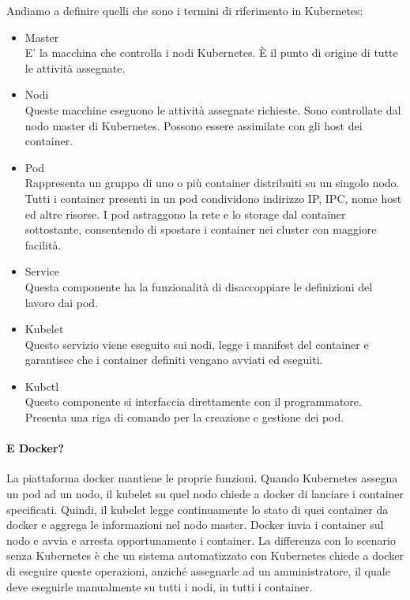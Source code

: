 Andiamo a definire quelli che sono i termini di riferimento in Kubernetes:
\begin{itemize}
	\item Master \\
	E' la macchina che controlla i nodi Kubernetes. È il punto di origine di tutte le attività assegnate.
	\item Nodi \\
	Queste macchine eseguono le attività assegnate richieste. Sono controllate dal nodo master di Kubernetes. Possono essere assimilate con gli host dei container.
	\item Pod \\
	Rappresenta un gruppo di uno o più container distribuiti su un singolo nodo. Tutti i container presenti in un pod condividono indirizzo IP, IPC, nome host ed altre risorse. I pod astraggono la rete e lo storage dal container sottostante, consentendo di spostare i container nei cluster con maggiore facilità.
	\item Service \\
	Questa componente ha la funzionalità di disaccoppiare le definizioni del lavoro dai pod.
	\item Kubelet \\
	Questo servizio viene eseguito sui nodi, legge i manifest del container e garantisce che i container definiti vengano avviati ed eseguiti.
	\item Kubctl \\
	Questo componente si interfaccia direttamente con il programmatore. Presenta una riga di comando per la creazione e gestione dei pod.
\end{itemize}

\paragraph{E Docker?}
La piattaforma docker mantiene le proprie funzioni. Quando Kubernetes assegna un pod ad un nodo, il kubelet su quel nodo chiede a docker di lanciare i container specificati. Quindi, il kubelet legge continuamente lo stato di quei container da docker e aggrega le informazioni nel nodo master. Docker invia i container sul nodo e avvia e arresta opportunamente i container. La differenza con lo scenario senza Kubernetes è che un sistema automatizzato con Kubernetes chiede a docker di eseguire queste operazioni, anziché assegnarle ad un amministratore, il quale deve eseguirle manualmente su tutti i nodi, in tutti i container.

